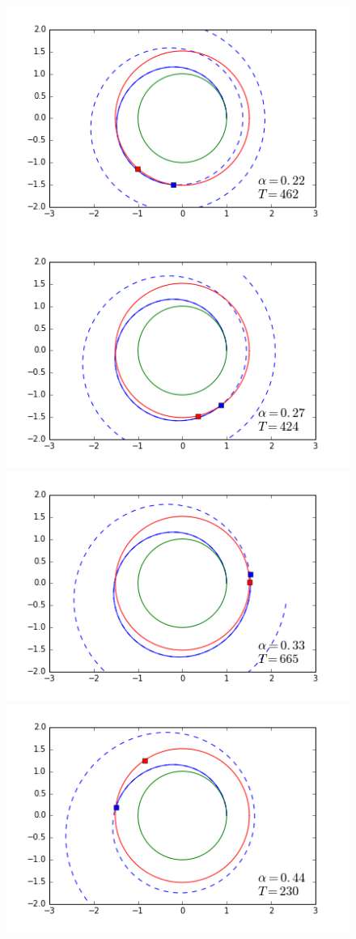 \documentclass[twocolumn,12pt,a4paper]{article}
\numberwithin{equation}{section}
\begin{document}
\begin{figure}
	\centering
	\includegraphics[scale=0.5]{simulacio1.png}
	\includegraphics[scale=0.5]{simulacio2.png}
	\includegraphics[scale=0.5]{simulacio3.png}
	\includegraphics[scale=0.5]{simulacio4.png}

\end{figure}
\end{document}
